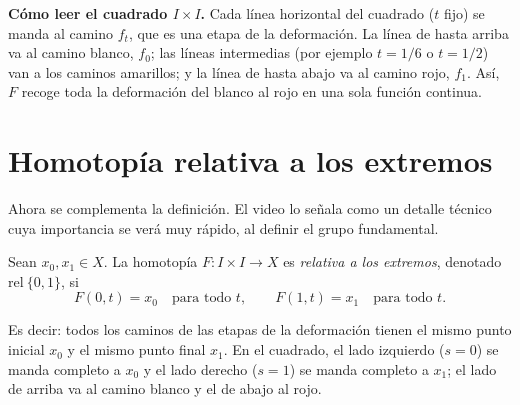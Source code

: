 \documentclass[11pt]{article}
\begin{document}
\noindent\textbf{Cómo leer el cuadrado $I\times I$.} Cada línea horizontal del cuadrado ($t$ fijo) se manda al camino $f_t$, que es una etapa de la deformación. La línea de hasta arriba va al camino blanco, $f_0$; las líneas intermedias (por ejemplo $t=1/6$ o $t=1/2$) van a los caminos amarillos; y la línea de hasta abajo va al camino rojo, $f_1$. Así, $F$ recoge toda la deformación del blanco al rojo en una sola función continua.

\section*{Homotopía relativa a los extremos}

Ahora se complementa la definición. El video lo señala como un detalle técnico cuya importancia se verá muy rápido, al definir el grupo fundamental.

\begin{defn}
Sean $x_0,x_1\in X$. La homotopía $F\colon I\times I\to X$ es \emph{relativa a los extremos}, denotado $\mathrm{rel}\ \{0,1\}$, si
\[
  F(0,t)=x_0\quad\text{para todo } t,
  \qquad
  F(1,t)=x_1\quad\text{para todo } t.
\]
\end{defn}

Es decir: todos los caminos de las etapas de la deformación tienen el mismo punto inicial $x_0$ y el mismo punto final $x_1$. En el cuadrado, el lado izquierdo ($s=0$) se manda completo a $x_0$ y el lado derecho ($s=1$) se manda completo a $x_1$; el lado de arriba va al camino blanco y el de abajo al rojo.
\end{document}

